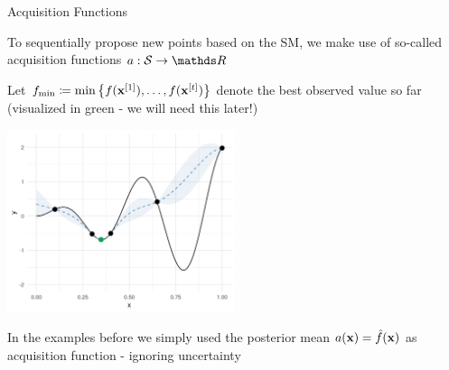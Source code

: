 \documentclass[11pt,compress,t,notes=noshow, xcolor=table]{beamer}
\begin{document}
\begin{vbframe}{Acquisition Functions}

To sequentially propose new points based on the SM, we make use of so-called acquisition functions $a: \mathcal{S} \to \R$\\

\vspace{1em}

Let $f_{\min} \coloneqq \min \left\{f(\mathbf{x}^{[1]}), \ldots, f(\mathbf{x}^{[t]})\right\}$ denote the best observed value so far (visualized in green - we will need this later!)

\vspace*{-0.2cm}

\begin{center}
  \includegraphics[width = 0.5\textwidth]{figure_man/bayesian_loop_sm_fmin.png}
\end{center}

\vspace*{-0.3cm}

In the examples before we simply used the posterior mean $a(\mathbf{x}) = \hat{f}(\mathbf{x})$ as acquisition function - ignoring uncertainty

\end{vbframe}
\end{document}
